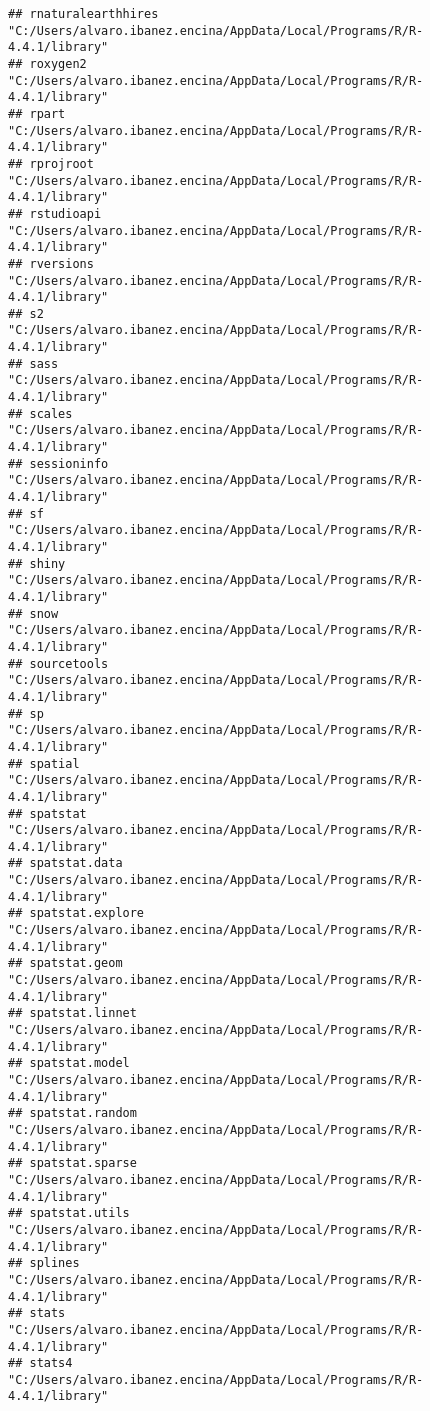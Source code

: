 \documentclass[
]{article}
\begin{document}
\begin{verbatim}
## rnaturalearthhires "C:/Users/alvaro.ibanez.encina/AppData/Local/Programs/R/R-4.4.1/library"
## roxygen2           "C:/Users/alvaro.ibanez.encina/AppData/Local/Programs/R/R-4.4.1/library"
## rpart              "C:/Users/alvaro.ibanez.encina/AppData/Local/Programs/R/R-4.4.1/library"
## rprojroot          "C:/Users/alvaro.ibanez.encina/AppData/Local/Programs/R/R-4.4.1/library"
## rstudioapi         "C:/Users/alvaro.ibanez.encina/AppData/Local/Programs/R/R-4.4.1/library"
## rversions          "C:/Users/alvaro.ibanez.encina/AppData/Local/Programs/R/R-4.4.1/library"
## s2                 "C:/Users/alvaro.ibanez.encina/AppData/Local/Programs/R/R-4.4.1/library"
## sass               "C:/Users/alvaro.ibanez.encina/AppData/Local/Programs/R/R-4.4.1/library"
## scales             "C:/Users/alvaro.ibanez.encina/AppData/Local/Programs/R/R-4.4.1/library"
## sessioninfo        "C:/Users/alvaro.ibanez.encina/AppData/Local/Programs/R/R-4.4.1/library"
## sf                 "C:/Users/alvaro.ibanez.encina/AppData/Local/Programs/R/R-4.4.1/library"
## shiny              "C:/Users/alvaro.ibanez.encina/AppData/Local/Programs/R/R-4.4.1/library"
## snow               "C:/Users/alvaro.ibanez.encina/AppData/Local/Programs/R/R-4.4.1/library"
## sourcetools        "C:/Users/alvaro.ibanez.encina/AppData/Local/Programs/R/R-4.4.1/library"
## sp                 "C:/Users/alvaro.ibanez.encina/AppData/Local/Programs/R/R-4.4.1/library"
## spatial            "C:/Users/alvaro.ibanez.encina/AppData/Local/Programs/R/R-4.4.1/library"
## spatstat           "C:/Users/alvaro.ibanez.encina/AppData/Local/Programs/R/R-4.4.1/library"
## spatstat.data      "C:/Users/alvaro.ibanez.encina/AppData/Local/Programs/R/R-4.4.1/library"
## spatstat.explore   "C:/Users/alvaro.ibanez.encina/AppData/Local/Programs/R/R-4.4.1/library"
## spatstat.geom      "C:/Users/alvaro.ibanez.encina/AppData/Local/Programs/R/R-4.4.1/library"
## spatstat.linnet    "C:/Users/alvaro.ibanez.encina/AppData/Local/Programs/R/R-4.4.1/library"
## spatstat.model     "C:/Users/alvaro.ibanez.encina/AppData/Local/Programs/R/R-4.4.1/library"
## spatstat.random    "C:/Users/alvaro.ibanez.encina/AppData/Local/Programs/R/R-4.4.1/library"
## spatstat.sparse    "C:/Users/alvaro.ibanez.encina/AppData/Local/Programs/R/R-4.4.1/library"
## spatstat.utils     "C:/Users/alvaro.ibanez.encina/AppData/Local/Programs/R/R-4.4.1/library"
## splines            "C:/Users/alvaro.ibanez.encina/AppData/Local/Programs/R/R-4.4.1/library"
## stats              "C:/Users/alvaro.ibanez.encina/AppData/Local/Programs/R/R-4.4.1/library"
## stats4             "C:/Users/alvaro.ibanez.encina/AppData/Local/Programs/R/R-4.4.1/library"

\end{verbatim}
\end{document}
